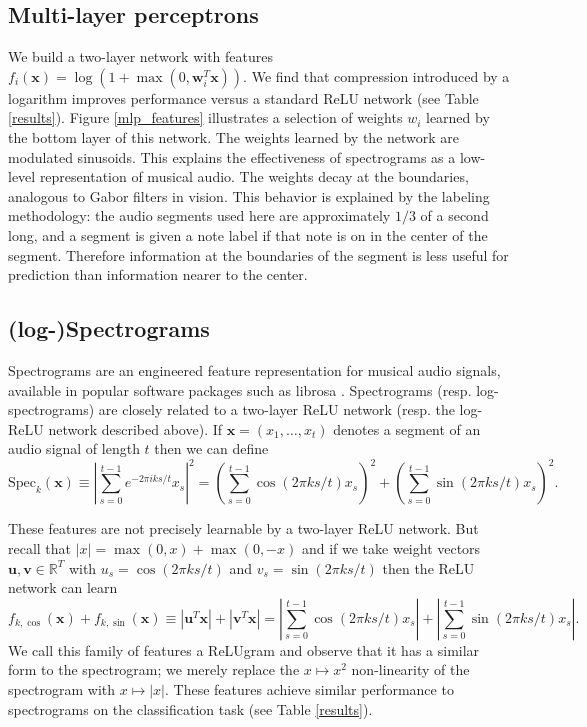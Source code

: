 \documentclass{article} \usepackage{iclr2017_conference,times}
\begin{document}
\subsection{Multi-layer perceptrons}

We build a two-layer network with features $f_i(\mathbf{x}) = \log \left(1 + \max(0,\textbf{w}_i^T\mathbf{x})\right)$. We find that compression introduced by a logarithm improves performance versus a standard ReLU network (see Table \ref{results}). Figure \ref{mlp_features} illustrates a selection of weights $w_i$ learned by the bottom layer of this network. The weights learned by the network are modulated sinusoids. This explains the effectiveness of spectrograms as a low-level representation of musical audio. The weights decay at the boundaries, analogous to Gabor filters in vision. This behavior is explained by the labeling methodology: the audio segments used here are approximately $1/3$ of a second long, and a segment is given a note label if that note is on in the center of the segment. Therefore information at the boundaries of the segment is less useful for prediction than information nearer to the center.

\subsection{(log-)Spectrograms}\label{spec_section}

Spectrograms are an engineered feature representation for musical audio signals, available in popular software packages such as librosa \citep{librosa}. Spectrograms (resp. log-spectrograms) are closely related to a two-layer ReLU network (resp. the log-ReLU network described above). If $\mathbf{x} = (x_1,\dots,x_t)$ denotes a segment of an audio signal of length $t$ then we can define
\begin{equation*}
\text{Spec}_k(\mathbf{x}) \equiv \left|\sum_{s=0}^{t-1} e^{-2\pi iks/t}x_s\right|^2  = \left(\sum_{s=0}^{t-1} \cos(2\pi ks/t)x_s\right)^2 + \left(\sum_{s=0}^{t-1} \sin(2\pi ks/t)x_s\right)^2.
\end{equation*}

These features are not precisely learnable by a two-layer ReLU network. But recall that $|x| = \max(0,x) + \max(0,-x)$ and if we take weight vectors $\mathbf{u},\mathbf{v} \in \mathbb{R}^T$ with $u_s = \cos(2\pi k s/t)$ and $v_s = \sin(2\pi k s/t)$ then the ReLU network can learn
\begin{equation*}
f_{k,\cos}(\mathbf{x}) + f_{k,\sin}(\mathbf{x}) \equiv |\mathbf{u}^T\mathbf{x}| + |\mathbf{v}^T\mathbf{x}| = \left|\sum_{s=0}^{t-1} \cos(2\pi ks/t)x_s\right| + \left|\sum_{s=0}^{t-1} \sin(2\pi ks/t)x_s\right|.
\end{equation*}
We call this family of features a ReLUgram and observe that it has a similar form to the spectrogram; we merely replace the $x \mapsto x^2$ non-linearity of the spectrogram with $x \mapsto |x|$. These features achieve similar performance to spectrograms on the classification task (see Table \ref{results}).
\end{document}
